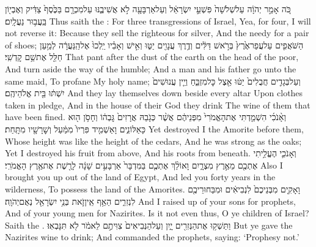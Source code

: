 \label{haft_9}
\setcounter{chap}{2}
\setcounter{verse}{6}
{כֹּ֚ה אָמַ֣ר יְהֹוָ֔ה עַל\maqqaf שְׁלֹשָׁה֙ פִּשְׁעֵ֣י יִשְׂרָאֵ֔ל וְעַל\maqqaf אַרְבָּעָ֖ה לֹ֣א אֲשִׁיבֶ֑נּוּ עַל\maqqaf מִכְרָ֤ם בַּכֶּ֙סֶף֙ צַדִּ֔יק וְאֶבְי֖וֹן בַּֽעֲב֥וּר נַעֲלָֽיִם׃}
{Thus saith the \lord: For three transgressions of Israel, Yea, for four, I will not reverse it: Because they sell the righteous for silver, And the needy for a pair of shoes;}
{הַשֹּׁאֲפִ֤ים עַל\maqqaf עֲפַר\maqqaf אֶ֙רֶץ֙ בְּרֹ֣אשׁ דַּלִּ֔ים וְדֶ֥רֶךְ עֲנָוִ֖ים יַטּ֑וּ וְאִ֣ישׁ וְאָבִ֗יו יֵֽלְכוּ֙ אֶל\maqqaf הַֽנַּעֲרָ֔ה לְמַ֥עַן חַלֵּ֖ל אֶת\maqqaf שֵׁ֥ם קׇדְשִֽׁי׃}
{That pant after the dust of the earth on the head of the poor, And turn aside the way of the humble; And a man and his father go unto the same maid, To profane My holy name;}
{וְעַל\maqqaf בְּגָדִ֤ים חֲבֻלִים֙ יַטּ֔וּ אֵ֖צֶל כׇּל\maqqaf מִזְבֵּ֑חַ וְיֵ֤ין עֲנוּשִׁים֙ יִשְׁתּ֔וּ בֵּ֖ית אֱלֹהֵיהֶֽם׃}
{And they lay themselves down beside every altar Upon clothes taken in pledge, And in the house of their God they drink The wine of them that have been fined.}
{וְאָ֨נֹכִ֜י הִשְׁמַ֤דְתִּי אֶת\maqqaf הָאֱמֹרִי֙ מִפְּנֵיהֶ֔ם אֲשֶׁ֨ר כְּגֹ֤בַהּ אֲרָזִים֙ גׇּבְה֔וֹ וְחָסֹ֥ן ה֖וּא כָּאַלּוֹנִ֑ים וָאַשְׁמִ֤יד פִּרְיוֹ֙ מִמַּ֔עַל וְשׇׁרָשָׁ֖יו מִתָּֽחַת׃}
{Yet destroyed I the Amorite before them, Whose height was like the height of the cedars, And he was strong as the oaks; Yet I destroyed his fruit from above, And his roots from beneath.}
{וְאָנֹכִ֛י הֶעֱלֵ֥יתִי אֶתְכֶ֖ם מֵאֶ֣רֶץ מִצְרָ֑יִם וָאוֹלֵ֨ךְ אֶתְכֶ֤ם בַּמִּדְבָּר֙ אַרְבָּעִ֣ים שָׁנָ֔ה לָרֶ֖שֶׁת אֶת\maqqaf אֶ֥רֶץ הָאֱמֹרִֽי׃}
{Also I brought you up out of the land of Egypt, And led you forty years in the wilderness, To possess the land of the Amorites.}
{וָאָקִ֤ים מִבְּנֵיכֶם֙ לִנְבִיאִ֔ים וּמִבַּחוּרֵיכֶ֖ם לִנְזִרִ֑ים הַאַ֥ף אֵֽין\maqqaf זֹ֛את בְּנֵ֥י יִשְׂרָאֵ֖ל נְאֻם\maqqaf יְהֹוָֽה׃}
{And I raised up of your sons for prophets, And of your young men for Nazirites. Is it not even thus, O ye children of Israel? Saith the \lord.}
{וַתַּשְׁק֥וּ אֶת\maqqaf הַנְּזִרִ֖ים יָ֑יִן וְעַל\maqqaf הַנְּבִיאִים֙ צִוִּיתֶ֣ם לֵאמֹ֔ר לֹ֖א תִּנָּבְאֽוּ׃}
{But ye gave the Nazirites wine to drink; And commanded the prophets, saying: ‘Prophesy not.’}
